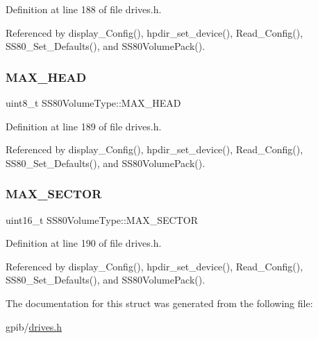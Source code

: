 Definition at line 188 of file drives.\+h.



Referenced by display\+\_\+\+Config(), hpdir\+\_\+set\+\_\+device(), Read\+\_\+\+Config(), S\+S80\+\_\+\+Set\+\_\+\+Defaults(), and S\+S80\+Volume\+Pack().

\mbox{\label{structSS80VolumeType_acc2870eb0a52a0e7f4dc57f036d903b1}} 
\subsubsection{\texorpdfstring{M\+A\+X\+\_\+\+H\+E\+AD}{MAX\_HEAD}}
{\footnotesize\ttfamily uint8\+\_\+t S\+S80\+Volume\+Type\+::\+M\+A\+X\+\_\+\+H\+E\+AD}



Definition at line 189 of file drives.\+h.



Referenced by display\+\_\+\+Config(), hpdir\+\_\+set\+\_\+device(), Read\+\_\+\+Config(), S\+S80\+\_\+\+Set\+\_\+\+Defaults(), and S\+S80\+Volume\+Pack().

\mbox{\label{structSS80VolumeType_a0a367b3bf05801cdee9dadc8324a3bdb}} 
\subsubsection{\texorpdfstring{M\+A\+X\+\_\+\+S\+E\+C\+T\+OR}{MAX\_SECTOR}}
{\footnotesize\ttfamily uint16\+\_\+t S\+S80\+Volume\+Type\+::\+M\+A\+X\+\_\+\+S\+E\+C\+T\+OR}



Definition at line 190 of file drives.\+h.



Referenced by display\+\_\+\+Config(), hpdir\+\_\+set\+\_\+device(), Read\+\_\+\+Config(), S\+S80\+\_\+\+Set\+\_\+\+Defaults(), and S\+S80\+Volume\+Pack().



The documentation for this struct was generated from the following file\+:\begin{DoxyCompactItemize}
\item 
gpib/\hyperlink{drives_8h}{drives.\+h}\end{DoxyCompactItemize}
